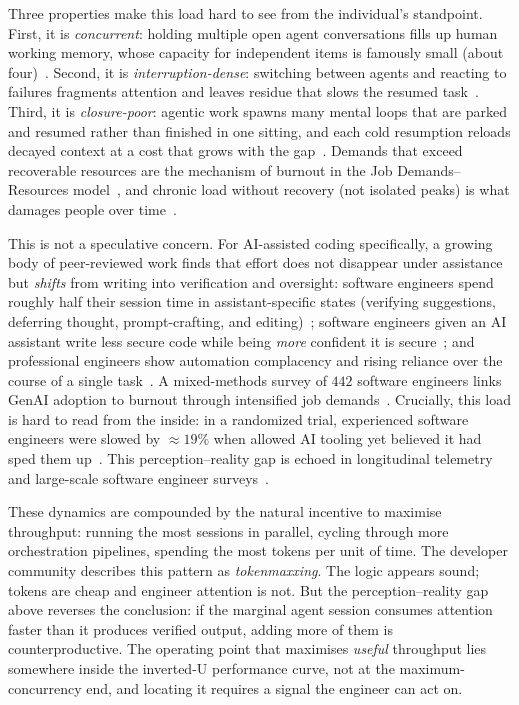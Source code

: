 \documentclass[10pt,twocolumn]{article}
\begin{document}
Three properties make this load hard to see from the individual's standpoint. First, it is
\emph{concurrent}: holding multiple open agent conversations fills up human working
memory, whose capacity for independent items is famously small (about
four)~\cite{cowan2001}. Second, it is \emph{interruption-dense}: switching
between agents and reacting to failures fragments attention and leaves residue
that slows the resumed task~\cite{mark2008,mark2005,leroy2009,wickens2008}.
Third, it is \emph{closure-poor}: agentic work spawns many mental loops that are parked
and resumed rather than finished in one sitting, and each cold resumption reloads
decayed context at a cost that grows with the gap~\cite{monk2008,altmann2002}.
Demands that exceed recoverable resources are the mechanism of burnout in the Job
Demands--Resources model~\cite{demerouti2001}, and chronic load without
recovery (not isolated peaks) is what damages people over
time~\cite{mcewen1998,sonnentag2010}.

This is not a speculative concern. For AI-assisted coding specifically, a
growing body of peer-reviewed work finds that effort does not disappear under
assistance but \emph{shifts} from writing into verification and oversight:
software engineers spend roughly half their session time in assistant-specific
states (verifying suggestions, deferring thought, prompt-crafting, and
editing)~\cite{mozannar2024}; software engineers given an AI assistant write less secure
code while being \emph{more} confident it is secure~\cite{perry2023}; and
professional engineers show automation complacency and rising reliance over the
course of a single task~\cite{qian2024}. A mixed-methods survey of $442$
software engineers links GenAI adoption to burnout through intensified job
demands~\cite{feng2026}. Crucially, this load is hard to read from the inside:
in a randomized trial, experienced software engineers were slowed by $\approx 19\%$ when
allowed AI tooling yet believed it had sped them up~\cite{metr2025}. This
perception--reality gap is echoed in longitudinal telemetry~\cite{sergeyuk2026} and
large-scale software engineer surveys~\cite{so2025}.

These dynamics are compounded by the natural incentive to maximise throughput:
running the most sessions in parallel, cycling through more orchestration
pipelines, spending the most tokens per unit of time. The developer community
describes this pattern as \emph{tokenmaxxing}. The logic appears sound; tokens
are cheap and engineer attention is not. But the perception--reality gap above
reverses the conclusion: if the marginal agent session consumes attention faster
than it produces verified output, adding more of them is counterproductive. The
operating point that maximises \emph{useful} throughput lies somewhere inside the
inverted-U performance curve, not at the maximum-concurrency end, and locating
it requires a signal the engineer can act on.
\end{document}
